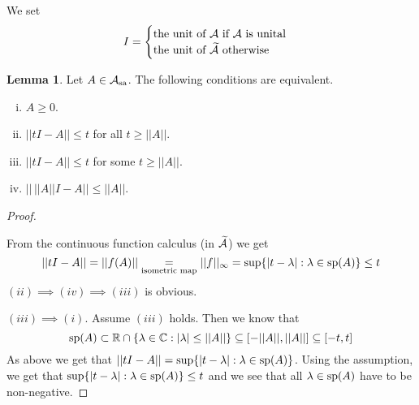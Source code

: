\documentclass[10pt,english,a4paper]{article}
\theoremstyle{definition}
\newtheorem*{lemma}{Lemma}
\def\tAs{\widetilde{\As}}
\def\Assa{\As_{\text{sa}}}
\DeclareMathOperator{\Sp}{sp}
\begin{document}
We set 
\[
I = \begin{cases} \text{the unit of $\As$ if $\As$ is unital} \\
\text{the unit of $\tAs$ otherwise} 
\end{cases}
\]

\begin{lemma}
    Let $A \in \Assa$. The following conditions are equivalent.
    \begin{enumerate}[(i)]
        \item $A \geq 0$.
        \item $||tI - A|| \leq t $ for all $t \geq ||A||$.
        \item $||tI - A|| \leq t $ for some $t \geq ||A||$.
        \item $||\, ||A||I - A|| \leq ||A||$.
    \end{enumerate}
\end{lemma}
\begin{proof}
\begin{figure}[htbp]
    \centering
    \caption{  } 
\end{figure}    
From the continuous function calculus (in $\tAs$) we get
\[ ||tI-A|| = ||f(A)|| \underset{\text{isometric map}}{=} ||f||_{\infty} 
    = \sup\{|t-\la| : \la \in \Sp(A) \} \leq t  \]
$(ii) \implies (iv) \implies (iii)$ is obvious. 

$(iii)\implies (i)$. Assume $(iii)$ holds.
Then we know that 
\[\Sp(A) \subset \R \cap \{ \la \in \C : |\la|\leq ||A|| \}
\subseteq [-||A|| ,||A||] \subseteq [-t,t]
\]
As above we get that 
$||tI - A || = \sup\{|t-\la|: \la \in \Sp(A)\}$.
Using the assumption, we get that 
$\sup\{|t-\la| : \la \in \Sp(A)\} \leq t$ and we see that all $\la \in \Sp(A)$
have to be non-negative. 
\end{proof}
\end{document}
